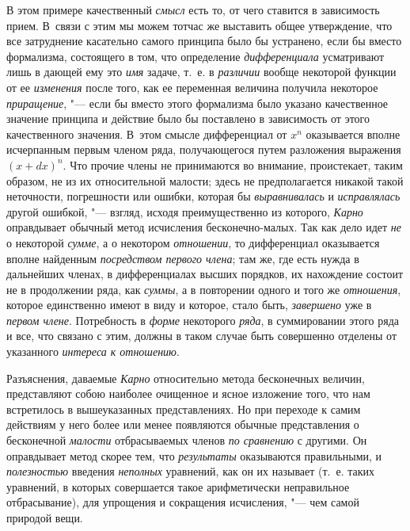 В этом примере качественный {\em смысл} есть то, от чего
ставится в зависимость прием. В~связи с этим мы можем тотчас же выставить
общее утверждение, что все затруднение касательно самого принципа было бы
устранено, если бы вместо формализма, состоящего в том, что определение
{\em дифференциала} усматривают лишь в дающей ему это
{\em имя} задаче, т.~е. в
{\em различии} вообще некоторой функции от ее
{\em изменения} после того, как ее переменная величина
получила некоторое {\em приращение}, "--- если бы вместо
этого формализма было указано качественное значение принципа и действие
было бы поставлено в зависимость от этого качественного значения. В~этом
смысле дифференциал от $x^n$ оказывается вполне исчерпанным первым членом
ряда, получающегося путем разложения выражения $(x+dx)^n$. Что
прочие члены не принимаются во внимание, проистекает, таким образом, не из
их относительной малости; здесь не предполагается никакой такой неточности,
погрешности или ошибки, которая бы {\em выравнивалась}
и {\em исправлялась} другой ошибкой, "--- взгляд, исходя
преимущественно из которого, {\em Карно} оправдывает
обычный метод исчисления бесконечно-малых. Так как дело идет
{\em не} о некоторой {\em сумме}, а
о некотором {\em отношении}, то дифференциал оказывается
вполне найденным {\em посредством первого члена}; там
же, где есть нужда в дальнейших членах, в дифференциалах высших порядков, их
нахождение состоит не в продолжении ряда, как
{\em суммы}, а в повторении одного и того же
{\em отношения}, которое единственно имеют в виду и
которое, стало быть, {\em завершено} уже в
{\em первом члене}. Потребность в
{\em форме} некоторого {\em ряда},
в суммировании этого ряда и все, что связано с этим, должны в таком случае
быть совершенно отделены от указанного {\em интереса к
отношению}.

Разъяснения, даваемые {\em Карно} относительно метода
бесконечных величин, представляют собою наиболее очищенное и ясное
изложение того, что нам встретилось в вышеуказанных представлениях. Но при
переходе к самим действиям у него более или менее появляются обычные
представления о бесконечной {\em малости} отбрасываемых
членов {\em по сравнению} с другими. Он оправдывает
метод скорее тем, что {\em результаты} оказываются
правильными, и {\em полезностью} введения
{\em неполных} уравнений, как он их называет (т.~е.
таких уравнений, в которых совершается такое арифметически неправильное
отбрасывание), для упрощения и сокращения исчисления, "--- чем самой природой
вещи.

